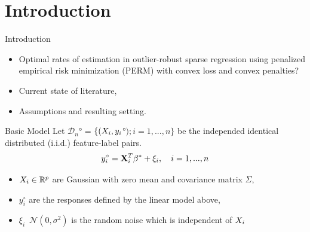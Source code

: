 \documentclass[unknownkeysallowed]{beamer}
\begin{document}
\section{Introduction}
\label{sec:introdcution}

\label{sub:un_premier_exemple}


\begin{frame}{Introduction}
	\begin{itemize}
		\item Optimal rates of estimation in outlier-robust sparse regression using penalized empirical risk minimization (PERM) with convex loss and convex penalties?
		\item Current state of literature,
		\item Assumptions and resulting setting.
	\end{itemize}
\end{frame}

\begin{frame}{Basic Model}
	Let $\mathcal{D}_n$° = $\{(\boldmath{X}_i, y_i$°$); i = 1,...,n \}$ be the independed identical distributed (i.i.d.) feature-label pairs.\\
	\begin{equation*}
	y_i^{\circ} = \bold{X}_i^T\beta^* + \xi_i, \quad i=1,...,n
	\end{equation*}
	
	\begin{itemize}
		\item  $\boldmath{X}_i \in \mathbb{R}^p$ are Gaussian with zero mean and covariance matrix $\Sigma$,
		\item  $y_i^{\circ}$ are the responses defined by the linear model above,
		\item  $\xi_i $~$ \mathcal{N}(0,\sigma^2)$ is the random noise which is independent of $\boldmath{X}_i$
	\end{itemize}
\end{frame}
\end{document}
